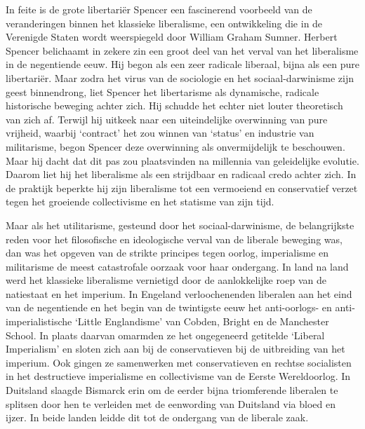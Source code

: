 \documentclass[
  a5paper,
  smalldemyvopaper,10pt,twoside,onecolumn,openright,extrafontsizes,hidelinks]{memoir}
\begin{document}
In feite is de grote libertariër Spencer een fascinerend voorbeeld van
de veranderingen binnen het klassieke liberalisme, een ontwikkeling die
in de Verenigde Staten wordt weerspiegeld door William Graham Sumner.
Herbert Spencer belichaamt in zekere zin een groot deel van het verval
van het liberalisme in de negentiende eeuw. Hij begon als een zeer
radicale liberaal, bijna als een pure libertariër. Maar zodra het virus
van de sociologie en het sociaal-darwinisme zijn geest binnendrong, liet
Spencer het libertarisme als dynamische, radicale historische beweging
achter zich. Hij schudde het echter niet louter theoretisch van zich af.
Terwijl hij uitkeek naar een uiteindelijke overwinning van pure
vrijheid, waarbij `contract' het zou winnen van `status' en industrie
van militarisme, begon Spencer deze overwinning als onvermijdelijk te
beschouwen. Maar hij dacht dat dit pas zou plaatsvinden na millennia van
geleidelijke evolutie. Daarom liet hij het liberalisme als een
strijdbaar en radicaal credo achter zich. In de praktijk beperkte hij
zijn liberalisme tot een vermoeiend en conservatief verzet tegen het
groeiende collectivisme en het statisme van zijn tijd.

Maar als het utilitarisme, gesteund door het sociaal-darwinisme, de
belangrijkste reden voor het filosofische en ideologische verval van de
liberale beweging was, dan was het opgeven van de strikte principes
tegen oorlog, imperialisme en militarisme de meest catastrofale oorzaak
voor haar ondergang. In land na land werd het klassieke liberalisme
vernietigd door de aanlokkelijke roep van de natiestaat en het imperium.
In Engeland verloochenenden liberalen aan het eind van de negentiende en
het begin van de twintigste eeuw het anti-oorlogs- en
anti-imperialistische `Little Englandisme' van Cobden, Bright en de
Manchester School. In plaats daarvan omarmden ze het ongegeneerd
getitelde `Liberal Imperialism' en sloten zich aan bij de conservatieven
bij de uitbreiding van het imperium. Ook gingen ze samenwerken met
conservatieven en rechtse socialisten in het destructieve imperialisme
en collectivisme van de Eerste Wereldoorlog. In Duitsland slaagde
Bismarck erin om de eerder bijna triomferende liberalen te splitsen door
hen te verleiden met de eenwording van Duitsland via bloed en ijzer. In
beide landen leidde dit tot de ondergang van de liberale zaak.
\end{document}
